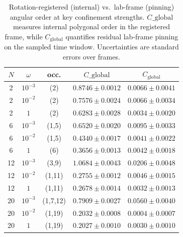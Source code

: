 \documentclass[superscriptaddress,unsortedaddress,amsmath,amssymb,aps]{revtex4-2}
\begin{document}
\begin{table}[t]
  \centering
  \caption{Rotation-registered (internal) vs.\ lab-frame (pinning) angular order at key confinement strengths.
  $C_{\tilde{}}\_{\mathrm{global}}$ measures internal polygonal order in the registered frame, while $C_{\mathrm{global}}$
  quantifies residual lab-frame pinning on the sampled time window. Uncertainties are standard errors over frames.}
  \label{tab:ang_order_key}

  \begin{threeparttable}
    \setlength{\tabcolsep}{5.8pt}
    \renewcommand{\arraystretch}{1.12}
    \begin{tabular}{c c c c c}
      \toprule
      $N$ & $\omega$ & occ. & $C_{\tilde{}}\_{\mathrm{global}}$ & $C_{\mathrm{global}}$ \\
      \midrule
      2  & $10^{-3}$ & (2)      & $0.8746\pm0.0012$ & $0.0066\pm0.0041$ \\
      2  & $10^{-2}$ & (2)      & $0.7576\pm0.0024$ & $0.0066\pm0.0034$ \\
      2  & $1$       & (2)      & $0.6283\pm0.0028$ & $0.0034\pm0.0020$ \\
      \midrule
      6  & $10^{-3}$ & (1,5)    & $0.6520\pm0.0020$ & $0.0095\pm0.0033$ \\
      6  & $10^{-2}$ & (1,5)    & $0.4340\pm0.0017$ & $0.0041\pm0.0022$ \\
      6  & $1$       & (6)      & $0.3656\pm0.0013$ & $0.0042\pm0.0018$ \\
      \midrule
      12 & $10^{-3}$ & (3,9)    & $1.0684\pm0.0043$ & $0.0206\pm0.0048$ \\
      12 & $10^{-2}$ & (1,11)   & $0.2755\pm0.0012$ & $0.0046\pm0.0015$ \\
      12 & $1$       & (1,11)   & $0.2678\pm0.0014$ & $0.0032\pm0.0013$ \\
      \midrule
      20 & $10^{-3}$ & (1,7,12) & $0.7909\pm0.0027$ & $0.0560\pm0.0040$ \\
      20 & $10^{-2}$ & (1,19)   & $0.2032\pm0.0008$ & $0.0004\pm0.0007$ \\
      20 & $1$       & (1,19)   & $0.2027\pm0.0010$ & $0.0030\pm0.0010$ \\
      \bottomrule
    \end{tabular}
  \end{threeparttable}
\end{table}
\end{document}
